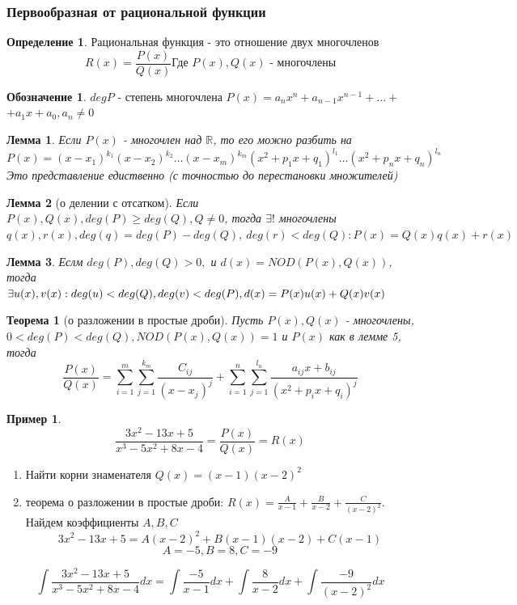 \documentclass[a4paper]{article}
\newtheorem{theorem}{Теорема}
\newtheorem{lemma}{Лемма}
\theoremstyle{definition}
\newtheorem*{definition*}{Определение}
\newtheorem*{name}{Обозначение}
\newtheorem*{exmp}{Пример}
\newtheorem*{comment}{Замечание}
\numberwithin{theorem}{subsection}
\numberwithin{lemma}{subsection}
\numberwithin{definition}{subsection}
\numberwithin{comment*}{subsection}
\numberwithin{consequence}{subsection}
\numberwithin{property}{subsection}
\begin{document}
\subsubsection{Первообразная от рациональной функции}
\begin{definition*}
 Рациональная функция - это отношение двух многочленов
 $$R(x)= \frac{P(x)}{Q(x)} \text{Где }P(x), Q(x) \text{ - многочлены}$$
\end{definition*}
\begin{name}
 $deg P$ - степень многочлена $P(x) = a_n x^n + a_{n-1}x^{n-1}+ \dots +$\\ $+ a_1 x + a_0, a_n \ne 0$
\end{name}

\begin{lemma}
 Если $P(x)$ - многочлен над $\mathbb{R}$, то его можно разбить на $P(x)= (x-x_1)^{k_1} (x-x_2)^{k_2} \dots (x-x_m)^{k_m} (x^2+ p_1 x+q_1)^{l_1} \dots (x^2+ p_n x+q_n)^{l_n}$
 Это представление едиственно (с точностью до перестановки множителей)
\end{lemma}
\begin{lemma}[о делении с отсатком]
 Если $P(x), Q(x), deg(P) \geq deg(Q),  Q \ne 0$, тогда $\exists{}!$ многочлены $q(x), r(x), deg(q) = deg(P)-deg(Q),\ deg(r) < deg(Q): P(x)=Q(x)q(x)+r(x)$
\end{lemma}
\begin{lemma}
 Еслм $deg(P), deg(Q)>0,$ и $d(x) = NOD(P(x), Q(x))$, тогда $\exists{u(x), v(x)}: deg(u)<deg(Q), deg(v)<deg(P),\\ d(x) = P(x)u(x) + Q(x)v(x)$
\end{lemma}
\begin{theorem}[о разложении в простые дроби]
 Пусть $P(x), Q(x)$ - многочлены, $0 < deg (P) < deg (Q), NOD(P(x), Q(x)) = 1$ и $P(x)$ как в лемме 5, тогда $$\frac{P(x)}{Q(x)} = \sum_{i=1}^{m}{\sum_{j=1}^{k_m}{\frac{C_{ij}}{(x-x_j)^j}}} + \sum_{i=1}^{n}{\sum_{j=1}^{l_n}{\frac{a_{ij}x+b_{ij}}{(x^2 + p_i x + q_i)^j}}}$$
\end{theorem}
\begin{exmp}
 $$ \frac{3x^2 - 13x + 5}{x^3 -5x^2 +8x -4} = \frac{P(x)}{Q(x)} = R(x)$$
 \begin{enumerate}
  \item Найти корни знаменателя
        $Q(x)=(x-1)(x-2)^2$
  \item теорема о разложении в простые дроби: $R(x) = \frac{A}{x-1}+ \frac{B}{x-2} + \frac{C}{(x-2)^2}$. Найдем коэффициенты $A, B, C$
        $$ 3x^2 - 13x + 5 = A(x-2)^2 + B(x-1)(x-2) + C(x-1)$$
        $$ A = -5, B = 8, C= -9$$
 \end{enumerate}
 $$ \int \frac{3x^2 - 13x + 5}{x^3 -5x^2 +8x -4} dx = \int \frac{-5}{x-1} dx + \int \frac{8}{x-2} dx + \int \frac{-9}{(x-2)^2} dx $$
\end{exmp}
\end{document}
